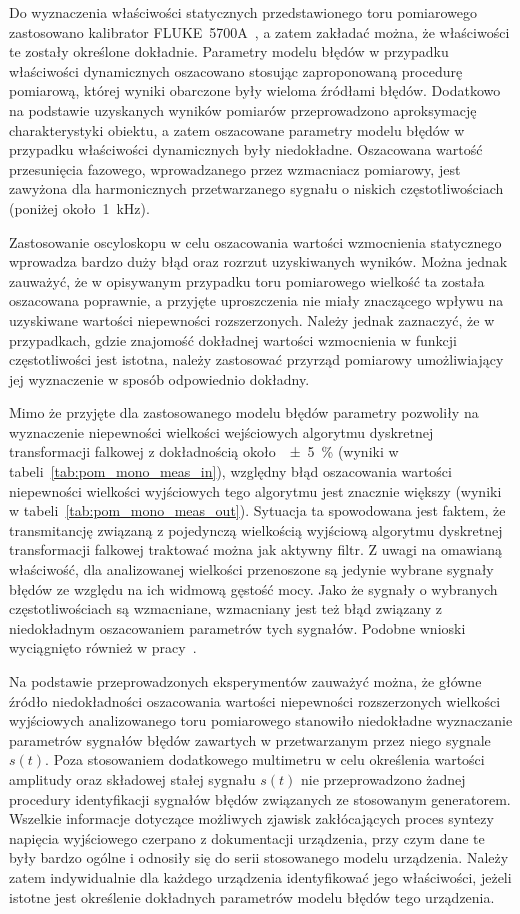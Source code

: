 Do wyznaczenia właściwości statycznych przedstawionego toru pomiarowego zastosowano kalibrator FLUKE~5700A~\cite{fluke_manual}, a zatem zakładać można, że właściwości te zostały określone dokładnie. Parametry modelu błędów w przypadku właściwości dynamicznych oszacowano stosując zaproponowaną procedurę pomiarową, której wyniki obarczone były wieloma źródłami błędów. Dodatkowo na podstawie uzyskanych wyników pomiarów przeprowadzono aproksymację charakterystyki obiektu, a zatem oszacowane parametry modelu błędów w przypadku właściwości dynamicznych były niedokładne. Oszacowana wartość przesunięcia fazowego, wprowadzanego przez wzmacniacz pomiarowy, jest zawyżona dla harmonicznych przetwarzanego sygnału o niskich częstotliwościach (poniżej około~\qty{1}{kHz}).

Zastosowanie oscyloskopu w celu oszacowania wartości wzmocnienia statycznego wprowadza bardzo duży błąd oraz rozrzut uzyskiwanych wyników. Można jednak zauważyć, że w opisywanym przypadku toru pomiarowego wielkość ta została oszacowana poprawnie, a przyjęte uproszczenia nie miały znaczącego wpływu na uzyskiwane wartości niepewności rozszerzonych. Należy jednak zaznaczyć, że w przypadkach, gdzie znajomość dokładnej wartości wzmocnienia w funkcji częstotliwości jest istotna, należy zastosować przyrząd pomiarowy umożliwiający jej wyznaczenie w sposób odpowiednio dokładny.

Mimo że przyjęte dla zastosowanego modelu błędów parametry pozwoliły na wyznaczenie niepewności wielkości wejściowych algorytmu dyskretnej transformacji falkowej z dokładnością około~\qty{\pm 5}{\percent} (wyniki w tabeli~\ref{tab:pom_mono_meas_in}), względny błąd oszacowania wartości niepewności wielkości wyjściowych tego algorytmu jest znacznie większy (wyniki w tabeli~\ref{tab:pom_mono_meas_out}). Sytuacja ta spowodowana jest faktem, że transmitancję związaną z pojedynczą wielkością wyjściową algorytmu dyskretnej transformacji falkowej traktować można jak aktywny filtr. Z uwagi na omawianą właściwość, dla analizowanej wielkości przenoszone są jedynie wybrane sygnały błędów ze względu na ich widmową gęstość mocy. Jako że sygnały o wybranych częstotliwościach są wzmacniane, wzmacniany jest też błąd związany z niedokładnym oszacowaniem parametrów tych sygnałów. Podobne wnioski wyciągnięto również w pracy~\cite{auth_estimation}.

Na podstawie przeprowadzonych eksperymentów zauważyć można, że główne źródło niedokładności oszacowania wartości niepewności rozszerzonych wielkości wyjściowych analizowanego toru pomiarowego stanowiło niedokładne wyznaczanie parametrów sygnałów błędów zawartych w przetwarzanym przez niego sygnale $s(t)$. Poza stosowaniem dodatkowego multimetru w celu określenia wartości amplitudy oraz składowej stałej sygnału $s(t)$ nie przeprowadzono żadnej procedury identyfikacji sygnałów błędów związanych ze stosowanym generatorem. Wszelkie informacje dotyczące możliwych zjawisk zakłócających proces syntezy napięcia wyjściowego czerpano z dokumentacji urządzenia, przy czym dane te były bardzo ogólne i odnosiły się do serii stosowanego modelu urządzenia. Należy zatem indywidualnie dla każdego urządzenia identyfikować jego właściwości, jeżeli istotne jest określenie dokładnych parametrów modelu błędów tego urządzenia.

